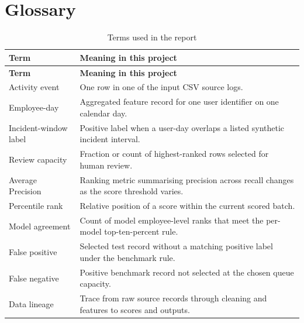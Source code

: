 \documentclass[12pt,a4paper,oneside]{report}
\begin{document}
\section{Glossary}
\begin{longtable}{|p{}|p{}|}
\caption{Terms used in the report}\label{tab:glossary}\\
\hline
\textbf{Term} & \textbf{Meaning in this project}\\\hline
\endfirsthead
\hline
\textbf{Term} & \textbf{Meaning in this project}\\\hline
\endhead
\hline
\endlastfoot
Activity event & One row in one of the input CSV source logs.\\\hline
Employee-day & Aggregated feature record for one user identifier on one calendar day.\\\hline
Incident-window label & Positive label when a user-day overlaps a listed synthetic incident interval.\\\hline
Review capacity & Fraction or count of highest-ranked rows selected for human review.\\\hline
Average Precision & Ranking metric summarising precision across recall changes as the score threshold varies.\\\hline
Percentile rank & Relative position of a score within the current scored batch.\\\hline
Model agreement & Count of model employee-level ranks that meet the per-model top-ten-percent rule.\\\hline
False positive & Selected test record without a matching positive label under the benchmark rule.\\\hline
False negative & Positive benchmark record not selected at the chosen queue capacity.\\\hline
Data lineage & Trace from raw source records through cleaning and features to scores and outputs.\\\hline
\end{longtable}
\end{document}
